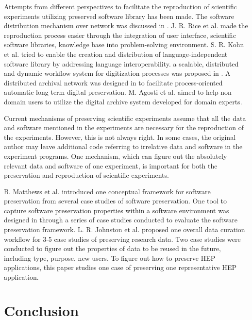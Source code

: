 \documentclass{acm_proc_article-sp}
\begin{document}
Attempts from different perspectives to facilitate the reproduction of scientific experiments utilizing preserved software library has been made. 
The software distribution mechanism over network was discussed in \cite{compostella2010cdf, blomer2011cernvm}.
J. R. Rice et al. \cite{rice1996scientific} made the reproduction process easier through the integration of user interface, scientific software libraries, knowledge base into problem-solving environment.
S. R. Kohn et al. \cite{kohn2001divorcing} tried to enable the creation and distribution of language-independent software library by addressing language interoperability.
a scalable, distributed and dynamic workflow system for digitization processes was proposed in \cite{schoneberg2013scalable}.
A distributed archival network was designed in \cite{subotic2013distributed} to facilitate process-oriented automatic long-term digital preservation.
M. Agosti et al. \cite{agosti2012envisage} aimed to help non-domain users to utilize the digital archive system developed for domain experts.

Current mechanisms of preserving scientific experiments assume that all the data and software mentioned in the experiments are necessary for the reproduction of the experiments. However, this is not always right. In some cases, the original author may leave additional code referring to irrelative data and software in the experiment programs. One mechanism, which can figure out the absolutely relevant data and software of one experiment, is important for both the preservation and reproduction of scientific experiments.

B. Matthews et al. \cite{matthews2008significant} introduced one conceptual framework for software preservation from several case studies of software preservation.
One tool to capture software preservation properties within a software environment was designed in \cite{matthews2010framework} through a series of case studies conducted to evaluate the software preservation framework.
L. R. Johnston et al. \cite{johnston2014workflow} proposed one overall data curation workflow for 3-5 case studies of preserving research data.
Two case studies \cite{borgman2012data} were conducted to figure out the properties of data to be reused in the future, including type, purpose, new users.
To figure out how to preserve HEP applications, this paper studies one case of preserving one representative HEP application.


\section{Conclusion}
\end{document}
